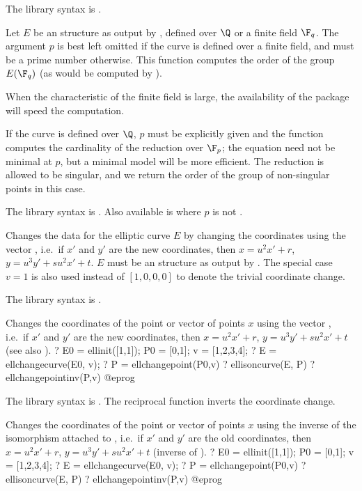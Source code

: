 The library syntax is .

\label{se:ellcard}
Let $E$ be an  structure as output by , defined over
$\Q$ or a finite field $\F_q$. The argument $p$ is best left omitted if the
curve is defined over a finite field, and must be a prime number otherwise.
This function computes the order of the group $E(\F_q)$ (as would be
computed by ).

When the characteristic of the finite field is large, the availability of
the  package will speed the computation.

If the curve is defined over $\Q$, $p$ must be explicitly given and the
function computes the cardinality of the reduction over $\F_p$; the
equation need not be minimal at $p$, but a minimal model will be more
efficient. The reduction is allowed to be singular, and we return the order
of the group of non-singular points in this case.

The library syntax is .
Also available is  where $p$ is not
.

\label{se:ellchangecurve}
Changes the data for the elliptic curve $E$
by changing the coordinates using the vector , i.e.~if $x'$
and $y'$ are the new coordinates, then $x=u^2x'+r$, $y=u^3y'+su^2x'+t$.
$E$ must be an  structure as output by . The special
case $v = 1$ is also used instead of $[1,0,0,0]$ to denote the
trivial coordinate change.

The library syntax is .

\label{se:ellchangepoint}
Changes the coordinates of the point or
vector of points $x$ using the vector , i.e.~if $x'$ and
$y'$ are the new coordinates, then $x=u^2x'+r$, $y=u^3y'+su^2x'+t$ (see also
).
\bprog
? E0 = ellinit([1,1]); P0 = [0,1]; v = [1,2,3,4];
? E = ellchangecurve(E0, v);
? P = ellchangepoint(P0,v)
? ellisoncurve(E, P)
? ellchangepointinv(P,v)
@eprog

The library syntax is .
The reciprocal function 
inverts the coordinate change.

\label{se:ellchangepointinv}
Changes the coordinates of the point or vector of points $x$ using
the inverse of the isomorphism attached to ,
i.e.~if $x'$ and $y'$ are the old coordinates, then $x=u^2x'+r$,
$y=u^3y'+su^2x'+t$ (inverse of ).
\bprog
? E0 = ellinit([1,1]); P0 = [0,1]; v = [1,2,3,4];
? E = ellchangecurve(E0, v);
? P = ellchangepoint(P0,v)
? ellisoncurve(E, P)
? ellchangepointinv(P,v)
@eprog

